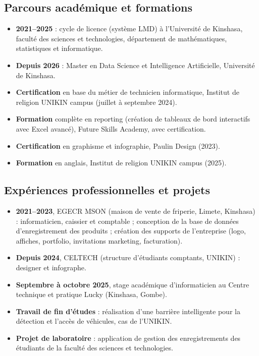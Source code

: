 \documentclass[11pt,a4paper]{article}
\begin{document}
\subsection{Parcours académique et formations}
\begin{itemize}
  \item \textbf{2021--2025} : cycle de licence (système LMD) à l'Université de Kinshasa, faculté des sciences et technologies, département de mathématiques, statistiques et informatique.
  \item \textbf{Depuis 2026} : Master en Data Science et Intelligence Artificielle, Université de Kinshasa.
  \item \textbf{Certification} en base du métier de technicien informatique, Institut de religion UNIKIN campus (juillet à septembre 2024).
  \item \textbf{Formation} complète en reporting (création de tableaux de bord interactifs avec Excel avancé), Future Skills Academy, avec certification.
  \item \textbf{Certification} en graphisme et infographie, Paulin Design (2023).
  \item \textbf{Formation} en anglais, Institut de religion UNIKIN campus (2025).
\end{itemize}

\subsection{Expériences professionnelles et projets}
\begin{itemize}
  \item \textbf{2021--2023}, EGECR MSON (maison de vente de friperie, Limete, Kinshasa) : informaticien, caissier et comptable ; conception de la base de données d'enregistrement des produits ; création des supports de l'entreprise (logo, affiches, portfolio, invitations marketing, facturation).
  \item \textbf{Depuis 2024}, CELTECH (structure d'étudiants comptants, UNIKIN) : designer et infographe.
  \item \textbf{Septembre à octobre 2025}, stage académique d'informaticien au Centre technique et pratique Lucky (Kinshasa, Gombe).
  \item \textbf{Travail de fin d'études} : réalisation d'une barrière intelligente pour la détection et l'accès de véhicules, cas de l'UNIKIN.
  \item \textbf{Projet de laboratoire} : application de gestion des enregistrements des étudiants de la faculté des sciences et technologies.
\end{itemize}
\end{document}
